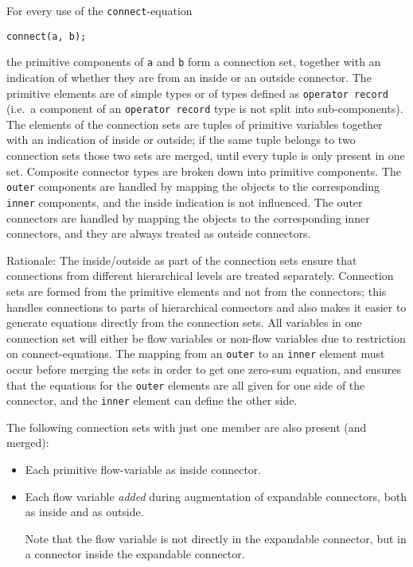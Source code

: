 For every use of the \lstinline!connect!-equation
\begin{lstlisting}[language=modelica]
connect(a, b);
\end{lstlisting}
the primitive components of \lstinline!a! and \lstinline!b! form a connection set, together with an indication of whether they are from an inside or an outside connector.  The primitive elements are
of simple types or of types defined as \lstinline!operator record! (i.e.\ a component of an \lstinline!operator record! type is not split into sub-components).  The elements of the connection sets
are tuples of primitive variables together with an indication of inside or outside; if the same tuple belongs to two connection sets those two sets are merged, until every tuple is only present in
one set.  Composite connector types are broken down into primitive components.  The \lstinline!outer! components are handled by mapping the objects to the corresponding \lstinline!inner! components,
and the inside indication is not influenced.  The outer connectors are handled by mapping the objects to the corresponding inner connectors, and they are always treated as outside connectors.

\begin{nonnormative}
Rationale: The inside/outside as part of the connection sets
ensure that connections from different hierarchical levels are treated
separately. Connection sets are formed from the primitive elements and
not from the connectors; this handles connections to parts of
hierarchical connectors and also makes it easier to generate equations
directly from the connection sets. All variables in one connection set
will either be flow variables or non-flow variables due to restriction
on connect-equations. The mapping from an \lstinline!outer! to an \lstinline!inner!
element must occur before merging the sets in order to get one
zero-sum equation, and ensures that the equations for the \lstinline!outer!
elements are all given for one side of the connector, and the
\lstinline!inner! element can define the other side.
\end{nonnormative}

The following connection sets with just one member are also present (and
merged):
\begin{itemize}
\item
  Each primitive flow-variable as inside connector.
\item
  Each flow variable \emph{added} during augmentation of expandable
  connectors, both as inside and as outside.
  \begin{nonnormative}
  Note that the flow variable is not directly in the expandable connector, but in a connector inside the expandable connector.
  \end{nonnormative}
\end{itemize}

